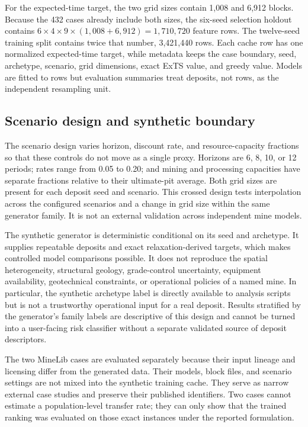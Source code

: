 \documentclass[11pt]{article}
\begin{document}
For the expected-time target, the two grid sizes contain 1,008 and 6,912 blocks. Because the 432 cases already include both sizes, the six-seed selection holdout contains $6\times4\times9\times(1{,}008+6{,}912)=1{,}710{,}720$ feature rows. The twelve-seed training split contains twice that number, 3,421,440 rows. Each cache row has one normalized expected-time target, while metadata keeps the case boundary, seed, archetype, scenario, grid dimensions, exact ExTS value, and greedy value. Models are fitted to rows but evaluation summaries treat deposits, not rows, as the independent resampling unit.

\subsection{Scenario design and synthetic boundary}
The scenario design varies horizon, discount rate, and resource-capacity fractions so that these controls do not move as a single proxy. Horizons are 6, 8, 10, or 12 periods; rates range from 0.05 to 0.20; and mining and processing capacities have separate fractions relative to their ultimate-pit average. Both grid sizes are present for each deposit seed and scenario. This crossed design tests interpolation across the configured scenarios and a change in grid size within the same generator family. It is not an external validation across independent mine models.

The synthetic generator is deterministic conditional on its seed and archetype. It supplies repeatable deposits and exact relaxation-derived targets, which makes controlled model comparisons possible. It does not reproduce the spatial heterogeneity, structural geology, grade-control uncertainty, equipment availability, geotechnical constraints, or operational policies of a named mine. In particular, the synthetic archetype label is directly available to analysis scripts but is not a trustworthy operational input for a real deposit. Results stratified by the generator's family labels are descriptive of this design and cannot be turned into a user-facing risk classifier without a separate validated source of deposit descriptors.

The two MineLib cases are evaluated separately because their input lineage and licensing differ from the generated data. Their models, block files, and scenario settings are not mixed into the synthetic training cache. They serve as narrow external case studies and preserve their published identifiers. Two cases cannot estimate a population-level transfer rate; they can only show that the trained ranking was evaluated on those exact instances under the reported formulation.
\end{document}
